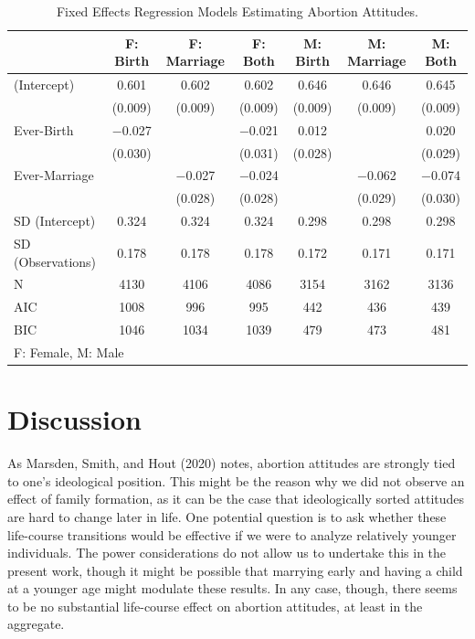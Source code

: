 \documentclass[
]{article}
\begin{document}
\begin{table}[H]

\caption{\label{tab:reg}Fixed Effects Regression Models Estimating Abortion Attitudes.}
\centering
\begin{tabular}[t]{lcccccc}
\toprule
  & F: Birth & F: Marriage & F: Both & M: Birth & M: Marriage & M: Both\\
\midrule
(Intercept) & \num{0.601} & \num{0.602} & \num{0.602} & \num{0.646} & \num{0.646} & \num{0.645}\\
 & (\num{0.009}) & (\num{0.009}) & (\num{0.009}) & (\num{0.009}) & (\num{0.009}) & (\num{0.009})\\
Ever-Birth & \num{-0.027} &  & \num{-0.021} & \num{0.012} &  & \num{0.020}\\
 & (\num{0.030}) &  & (\num{0.031}) & (\num{0.028}) &  & (\num{0.029})\\
Ever-Marriage &  & \num{-0.027} & \num{-0.024} &  & \num{-0.062} & \num{-0.074}\\
 &  & (\num{0.028}) & (\num{0.028}) &  & (\num{0.029}) & (\num{0.030})\\
SD (Intercept) & \num{0.324} & \num{0.324} & \num{0.324} & \num{0.298} & \num{0.298} & \num{0.298}\\
SD (Observations) & \num{0.178} & \num{0.178} & \num{0.178} & \num{0.172} & \num{0.171} & \num{0.171}\\
\midrule
N & \num{4130} & \num{4106} & \num{4086} & \num{3154} & \num{3162} & \num{3136}\\
AIC & \num{1008} & \num{996} & \num{995} & \num{442} & \num{436} & \num{439}\\
BIC & \num{1046} & \num{1034} & \num{1039} & \num{479} & \num{473} & \num{481}\\
\bottomrule
\multicolumn{7}{l}{\rule{0pt}{1em}F: Female, M: Male}\\
\end{tabular}
\end{table}

\hypertarget{discussion}{%
\section{Discussion}\label{discussion}}

As Marsden, Smith, and Hout (2020) notes, abortion attitudes are strongly tied to one's ideological position. This might be the reason why we did not observe an effect of family formation, as it can be the case that ideologically sorted attitudes are hard to change later in life. One potential question is to ask whether these life-course transitions would be effective if we were to analyze relatively younger individuals. The power considerations do not allow us to undertake this in the present work, though it might be possible that marrying early and having a child at a younger age might modulate these results. In any case, though, there seems to be no substantial life-course effect on abortion attitudes, at least in the aggregate.
\end{document}
